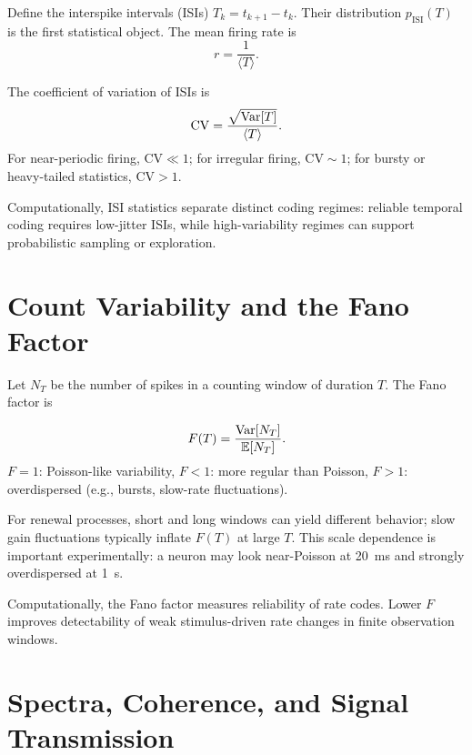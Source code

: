 Define the interspike intervals (ISIs) $T_k = t_{k+1}-t_k$. Their distribution $p_{\text{ISI}}(T)$ is the first statistical object. The mean firing rate is
%
\begin{equation}
  r = \frac{1}{\langle T \rangle}.
  \label{eq:rate-isi}
\end{equation}
%

The coefficient of variation of ISIs is
%
\begin{equation}
  \mathrm{CV} = \frac{\sqrt{\operatorname{Var}[T]}}{\langle T \rangle}.
  \label{eq:cv}
\end{equation}
%
For near-periodic firing, $\mathrm{CV}\ll 1$; for irregular firing, $\mathrm{CV}\sim 1$; for bursty or heavy-tailed statistics, $\mathrm{CV}>1$.

Computationally, ISI statistics separate distinct coding regimes: reliable temporal coding requires low-jitter ISIs, while high-variability regimes can support probabilistic sampling or exploration.

\section{Count Variability and the Fano Factor}
\label{sec:fano}

Let $N_T$ be the number of spikes in a counting window of duration $T$. The Fano factor is
%
\begin{keyequation}
\begin{equation}
  F(T) = \frac{\operatorname{Var}[N_T]}{\mathbb{E}[N_T]}.
  \label{eq:fano}
\end{equation}
\tcblower
$F=1$: Poisson-like variability, \quad
$F<1$: more regular than Poisson, \quad
$F>1$: overdispersed (e.g., bursts, slow-rate fluctuations).
\end{keyequation}

For renewal processes, short and long windows can yield different behavior; slow gain fluctuations typically inflate $F(T)$ at large $T$. This scale dependence is important experimentally: a neuron may look near-Poisson at 20~ms and strongly overdispersed at 1~s.

Computationally, the Fano factor measures reliability of rate codes. Lower $F$ improves detectability of weak stimulus-driven rate changes in finite observation windows.

\section{Spectra, Coherence, and Signal Transmission}
\label{sec:spectra-coherence}

